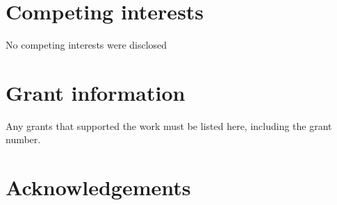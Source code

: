 \documentclass[9pt,a4paper,]{extarticle}
\begin{document}
\hypertarget{competing-interests}{%
\section{Competing interests}\label{competing-interests}}

No competing interests were disclosed

\hypertarget{grant-information}{%
\section{Grant information}\label{grant-information}}

Any grants that supported the work must be listed here, including the grant number.

\hypertarget{acknowledgements}{%
\section{Acknowledgements}\label{acknowledgements}}

\renewcommand\refname{References}
{\small}
\end{document}

